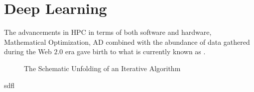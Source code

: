 \section{Deep Learning}
The advancements in \ac{HPC}\cite{Meuer} in terms of both software\cite{OpenMPCommette}\cite{MPICommittee}\cite{Nvidia} and 
hardware\cite{Patterson2014}\cite{Hennessy2019}\cite{Nvidia}, Mathematical Optimization\cite{Boyd2004}\cite{Nocedal2006}\cite{Sun2019}, 
\ac{AD}\cite{Naumann2011}\cite{Griewank2008} combined with the abundance of data gathered during the Web $2.0$ era gave birth 
to what is currently known as \dl\cite{LeCun2015}\cite{Higham2018}\cite{Berner2021}.  



\begin{figure}
  \centering
	\captionsetup{justification=centering}
  \resizebox{35em}{10em}{}
  \caption{The Schematic Unfolding of an Iterative Algorithm}
  \label{fig:deep_unfolding}
\end{figure}
sdfl
